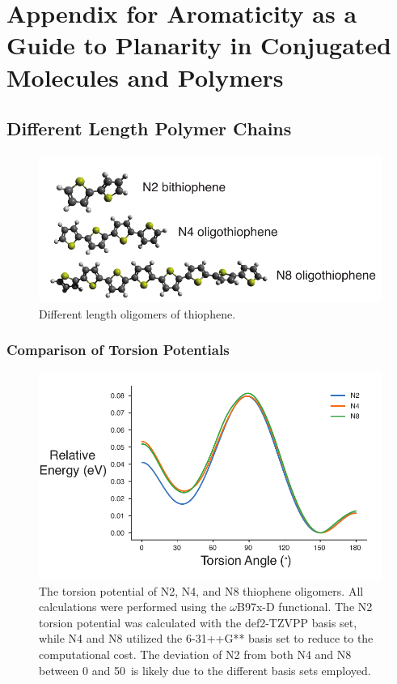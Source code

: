 \chapter{Appendix for Aromaticity as a Guide to Planarity in Conjugated Molecules and Polymers}

\section{Different Length Polymer Chains}
\begin{figure}[hbt!]
    \centering
    \includegraphics{figures/append_aroma/p_chains_graphic_copy.pdf}
    \caption{Different length oligomers of thiophene.}
    \label{fig:p_chains}
\end{figure}

\subsection{Comparison of Torsion Potentials}
\begin{figure}[hbt!]
    \centering
    \includegraphics{figures/append_aroma/p_tor_compare_copy.pdf}
    \caption{The torsion potential of N2, N4, and N8 thiophene oligomers. All calculations were performed using the $\omega$B97x-D functional. The N2 torsion potential was calculated with the def2-TZVPP basis set, while N4 and N8 utilized the 6-31++G**\cite{Hehre1972} basis set to reduce to the computational cost. The deviation of N2 from both N4 and N8 between 0 and 50\textdegree \ is likely due to the different basis sets employed.}
    \label{fig:p_tor_compare}
\end{figure}

